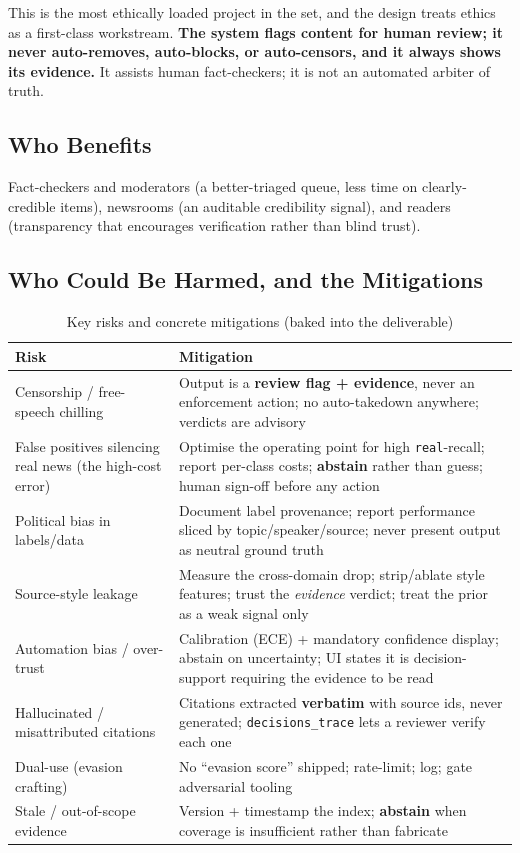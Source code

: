\documentclass[12pt,a4paper]{article}
\begin{document}
This is the most ethically loaded project in the set, and the design treats ethics as a first-class workstream. \textbf{The system flags content for human review; it never auto-removes, auto-blocks, or auto-censors, and it always shows its evidence.} It assists human fact-checkers; it is not an automated arbiter of truth.

\subsection{Who Benefits}

Fact-checkers and moderators (a better-triaged queue, less time on clearly-credible items), newsrooms (an auditable credibility signal), and readers (transparency that encourages verification rather than blind trust).

\subsection{Who Could Be Harmed, and the Mitigations}

\begin{table}[H]
\centering
\caption{Key risks and concrete mitigations (baked into the deliverable)}
\small
\begin{tabularx}{\linewidth}{@{} L L @{}}
\toprule
\textbf{Risk} & \textbf{Mitigation} \\
\midrule
Censorship / free-speech chilling & Output is a \textbf{review flag + evidence}, never an enforcement action; no auto-takedown anywhere; verdicts are advisory \\
False positives silencing real news (the high-cost error) & Optimise the operating point for high \texttt{real}-recall; report per-class costs; \textbf{abstain} rather than guess; human sign-off before any action \\
Political bias in labels/data & Document label provenance; report performance sliced by topic/speaker/source; never present output as neutral ground truth \\
Source-style leakage & Measure the cross-domain drop; strip/ablate style features; trust the \emph{evidence} verdict; treat the prior as a weak signal only \\
Automation bias / over-trust & Calibration (ECE) + mandatory confidence display; abstain on uncertainty; UI states it is decision-support requiring the evidence to be read \\
Hallucinated / misattributed citations & Citations extracted \textbf{verbatim} with source ids, never generated; \texttt{decisions\_trace} lets a reviewer verify each one \\
Dual-use (evasion crafting) & No ``evasion score'' shipped; rate-limit; log; gate adversarial tooling \\
Stale / out-of-scope evidence & Version + timestamp the index; \textbf{abstain} when coverage is insufficient rather than fabricate \\
\bottomrule
\end{tabularx}
\end{table}
\end{document}

